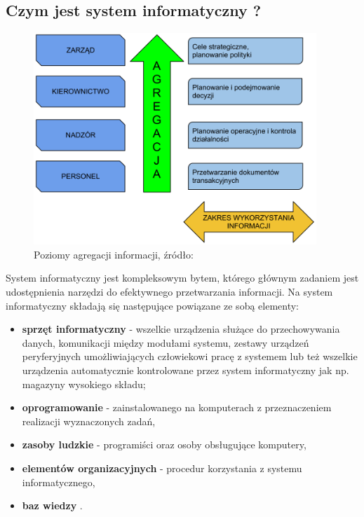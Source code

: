 	\subsection{Czym jest system informatyczny ?}
		\begin{figure}[H]
			\centering
			\includegraphics[width=0.95\textwidth]{images/poziomy_agregacji_informacji}
			\caption[Poziomy agregacji informacji w systemie informatycznym]{
				Poziomy agregacji informacji, 
				źródło: \cite{IDL}
			}
			\label{c3:information_level_figure}
		\end{figure}
		System informatyczny jest kompleksowym bytem, którego głównym zadaniem 
		jest udos\-tępnienia narzędzi do efektywnego przetwarzania informacji. 
		Na system informatyczny składają się następujące powiązane ze sobą elementy:
		\begin{itemize}
			\item \textbf{sprzęt informatyczny} - wszelkie urządzenia służące
			do przechowywania danych, komunikacji między modułami systemu, zestawy urządzeń
			peryferyjnych umożliwiających człowiekowi pracę z systemem lub też wszelkie urządzenia
			automatycznie kontrolowane przez system informatyczny jak np. magazyny wysokiego składu;
			\item \textbf{oprogramowanie} - zainstalowanego na komputerach z przeznaczeniem realizacji
			wyznaczonych zadań,
			\item \textbf{zasoby ludzkie} - programiści oraz osoby obsługujące komputery,
			\item \textbf{elementów organizacyjnych} - procedur korzystania z systemu informatycznego,
			\item \textbf{baz wiedzy} \cite{logistyka_w_przedsiebiorstwie}.
		\end{itemize}
		
